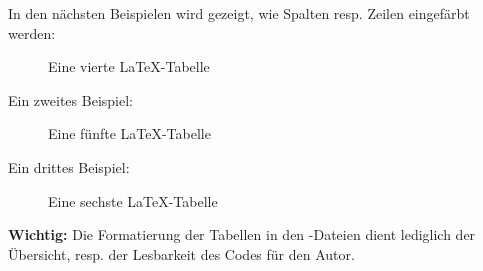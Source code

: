 In den nächsten Beispielen wird gezeigt, wie Spalten resp. Zeilen eingefärbt werden:  



\begin{figure}[h!]
    \centering
      \caption{Eine vierte LaTeX-Tabelle}
\end{figure} 

\newpage
Ein zweites Beispiel:



\begin{figure}[h!]
    \centering
      \caption{Eine fünfte LaTeX-Tabelle}
\end{figure} 

Ein drittes Beispiel:



\begin{figure}[h!]
    \centering
      \caption{Eine sechste LaTeX-Tabelle}
\end{figure} 

\textbf{Wichtig:} Die Formatierung der Tabellen in den -Dateien dient lediglich der Übersicht, resp. der Lesbarkeit des Codes für den Autor.
